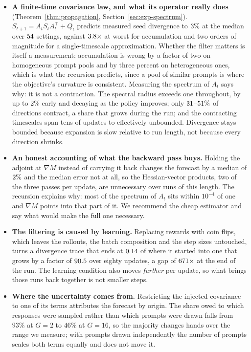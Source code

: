\begin{itemize}
  \item \textbf{A finite-time covariance law, and what its operator really does}
  (Theorem~\ref{thm:propagation}, Section~\ref{sec:exp-spectrum}).
  $S_{t+1} = A_t S_t A_t^{\!\top} + Q_t$ predicts measured seed divergence to
  $3\%$ at the median over $54$ settings, against
  $3.8\times$ at worst for accumulation and two orders of magnitude for a
  single-timescale approximation. Whether the filter matters is itself a measurement: accumulation
  is wrong by a factor of two on homogeneous prompt pools and by three percent on heterogeneous
  ones, which is what the recursion predicts, since a pool of similar prompts is where the
  objective's curvature is consistent. Measuring the spectrum of $A_t$ says why: it is not a contraction.
  The spectral radius exceeds one throughout, by up to $2\%$ early and decaying as the policy
  improves; only $31$--$51\%$ of directions contract, a share that grows during the run; and the
  contracting timescales span tens of updates to effectively unbounded. Divergence stays bounded
  because expansion is slow relative to run length, not because every direction shrinks.

  \item \textbf{An honest accounting of what the backward pass buys.} Holding the adjoint at
  $\nabla M$ instead of carrying it back changes the forecast by a median of $2\%$ and the median
  error not at all, so the Hessian-vector products, two of the three passes per update, are
  unnecessary over runs of this length. The recursion explains why: most of the spectrum of $A_t$
  sits within $10^{-4}$ of one and $\nabla M$ points into that part of it. We recommend the cheap
  estimator and say what would make the full one necessary.

  \item \textbf{The filtering is caused by learning.} Replacing rewards with coin flips, which
  leaves the rollouts, the batch composition and the step sizes untouched, turns a divergence trace
  that ends at $0.14$ of where it started into one that grows by a factor of $90.5$ over eighty
  updates, a gap of $671\times$ at the end of the run. The learning condition also moves
  \emph{further} per update, so what brings those runs back together is not smaller steps.

  \item \textbf{Where the uncertainty comes from.} Restricting the injected covariance to one of
  its terms attributes the forecast by origin. The share owed to which responses were sampled
  rather than which prompts were drawn falls from $93\%$ at $G=2$ to $46\%$ at $G=16$, so the
  majority changes hands over the range we measure; with prompts drawn independently the number of
  prompts scales both terms equally and does not move it.


\end{itemize}

